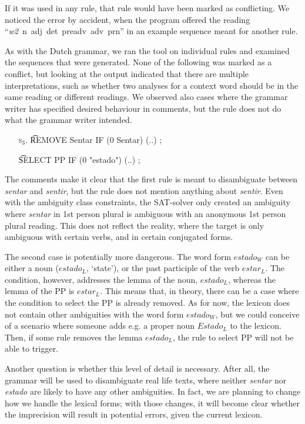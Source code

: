 {{If it was used in any rule, that rule would have been marked as
conflicting. We noticed the error by accident, when the program
offered the reading ``\emph{w2}~n~adj~det~preadv~adv~prn''
in an example sequence meant for another rule.


As with the Dutch grammar, we ran the tool on individual rules and
examined the sequences that were generated. None of the following was
marked as a conflict, but looking at the output indicated that there
are multiple interpretations, such as whether two analyses for a
context word should be in the same reading or different readings.
We observed also cases where the grammar writer has specified desired
behaviour in comments, but the rule does not do what the grammar
writer intended. 

\begin{itemize}
\item[\textsc{s$_3$.}] \t{REMOVE Sentar IF (0 Sentar) (..) ;}
\item[] \t{SELECT PP IF (0 "estado") (..) ;}
\end{itemize}

The comments make it clear that the first rule is meant to disambiguate between \emph{sentar} and \emph{sentir}, but the rule does not mention anything about \emph{sentir}.
Even with the ambiguity class constraints, the SAT-solver only created an ambiguity where \emph{sentar} in 1st person plural is ambiguous with an anonymous 1st person plural reading.
This does not reflect the reality, where the target is only ambiguous with certain verbs, and in certain conjugated forms.

The second case is potentially more dangerous. 
The word form $estado_{W}$ 
can be either a noun ($estado_{L}$, `state'), or the past participle of the verb $estar_{L}$. 
The condition, however, addresses the lemma of the noun, $estado_L$, whereas the lemma of the PP is $estar_{L}$.
This means that, in theory, there can be a case where the condition to select the PP is already removed. As for now, the lexicon does not contain other ambiguities with the word form $estado_{W}$, but we could conceive of a scenario where someone adds e.g. a proper noun $Estado_{L}$ to the lexicon. Then, if some rule removes the lemma $estado_{L}$, the rule to select PP will not be able to trigger.


Another question is whether this level of detail is necessary. 
After all, the grammar will be used to disambiguate real life texts, where neither \emph{sentar} nor \emph{estado} are likely to have any other ambiguities.
In fact, we are planning to change how we handle the lexical forms; with those changes, it will become clear whether the imprecision will result in potential errors, given the current lexicon. 





}}
